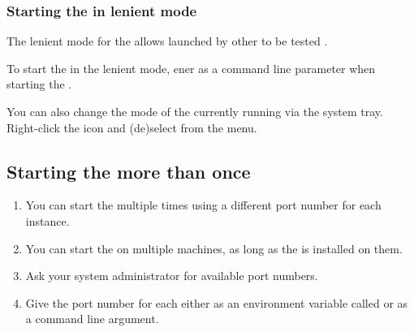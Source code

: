 \subsubsection{Starting the \gdagent{} in lenient mode}
\label{TasksAgentLenient}

The lenient mode for the \gdagent{} allows \gdauts{} launched  by other \gdauts{} to be tested .

To start the \gdagent{} in the lenient mode, ener  as a command line parameter when starting the \gdagent{}. 

You can also change the mode of the currently running \gdagent{} via the system tray. Right-click the \gdagent{} icon and (de)select  from the menu. 



\subsection{Starting the \gdserver more than once}
\begin{enumerate}
\item You can start the \gdserver{} multiple times using a different
port number for each instance. 
\item You can start the \gdserver on multiple machines, as long as the \gdserver is installed on them.
\item Ask your system administrator for available  port numbers.
\item Give the port number for each \gdserver either as an environment variable
called  or as a command line argument. 
\end{enumerate}

